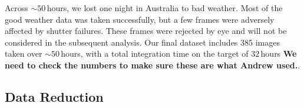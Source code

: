 \documentclass[iop]{emulateapj}
\makeatletter
\newenvironment{inlinefigure}{
\def\@captype{figure}
\noindent\begin{minipage}{0.999\linewidth}\begin{center}}
{\end{center}\end{minipage}\smallskip}
\makeatother
\begin{document}
Across $\sim 50$\,hours, we lost one night in Australia to bad
weather. Most of the good weather data was taken successfully, but a
few frames were adversely affected by shutter failures. These frames
were rejected by eye and will not be considered in the subsequent
analysis. Our final dataset includes 385 images taken over
$\sim 50$\,hours, with a total integration time on the target of
$32$\,hours \textbf{We need to check the numbers to make sure these
  are what Andrew used.}.
	
\begin{inlinefigure}
\begin{center}
\end{center}
\end{inlinefigure}


\subsection{Data Reduction}
 
\end{document}
